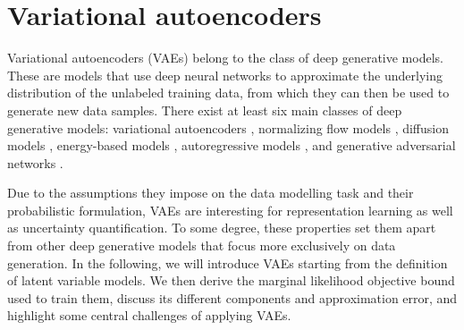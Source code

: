 \section{Variational autoencoders}\label{sec:variational-autoencoders}
%
Variational autoencoders (VAEs) belong to the class of deep generative models. 
These are models that use deep neural networks to approximate the underlying distribution of the unlabeled training data, from which they can then be used to generate new data samples. 
There exist at least six main classes of deep generative models: variational autoencoders \parencite{kingma_autoencoding_2014,rezende_stochastic_2014,ranganath_hierarchical_2016,vahdat_nvae_2020,child_very_2021}, normalizing flow models \parencite{dinh_nice_2015,rezende_variational_2015,dinh_density_2017,kingma_glow_2018,grathwohl_ffjord_2018}, diffusion models \parencite{sohl-dickstein_deep_2015,song_generative_2019, ho_denoising_2020, vahdat_scorebased_2021}, energy-based models \parencite{lecun_tutorial_2006,hinton_fast_2006,salakhutdinov_efficient_2010,du_implicit_2019}, autoregressive models \parencite{oord_conditional_2016,oord_wavenet_2016,radford_improving_2018}, and generative adversarial networks \parencite{goodfellow_generative_2014,arjovsky_wasserstein_2017,brock_large_2019,karras_stylebased_2019}. 

Due to the assumptions they impose on the data modelling task and their probabilistic formulation, VAEs are interesting for representation learning as well as uncertainty quantification. To some degree, these properties set them apart from other deep generative models that focus more exclusively on data generation. 
In the following, we will introduce VAEs starting from the definition of latent variable models. We then derive the marginal likelihood objective bound used to train them, discuss its different components and approximation error, and highlight some central challenges of applying VAEs. 


